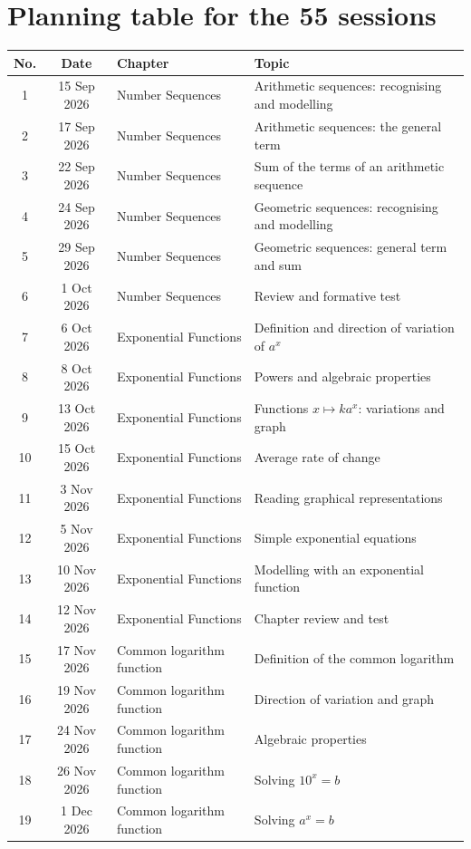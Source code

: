 \chapter{Planning table for the 55 sessions}
\small
\begin{longtable}{cclp{}}
\toprule
No. & Date & Chapter & Topic\\
\midrule\endhead
1 & 15 Sep 2026 & Number Sequences & Arithmetic sequences: recognising and modelling\\
2 & 17 Sep 2026 & Number Sequences & Arithmetic sequences: the general term\\
3 & 22 Sep 2026 & Number Sequences & Sum of the terms of an arithmetic sequence\\
4 & 24 Sep 2026 & Number Sequences & Geometric sequences: recognising and modelling\\
5 & 29 Sep 2026 & Number Sequences & Geometric sequences: general term and sum\\
6 & 1 Oct 2026 & Number Sequences & Review and formative test\\
7 & 6 Oct 2026 & Exponential Functions & Definition and direction of variation of $a^x$\\
8 & 8 Oct 2026 & Exponential Functions & Powers and algebraic properties\\
9 & 13 Oct 2026 & Exponential Functions & Functions $x\mapsto k a^x$: variations and graph\\
10 & 15 Oct 2026 & Exponential Functions & Average rate of change\\
11 & 3 Nov 2026 & Exponential Functions & Reading graphical representations\\
12 & 5 Nov 2026 & Exponential Functions & Simple exponential equations\\
13 & 10 Nov 2026 & Exponential Functions & Modelling with an exponential function\\
14 & 12 Nov 2026 & Exponential Functions & Chapter review and test\\
15 & 17 Nov 2026 & Common logarithm function & Definition of the common logarithm\\
16 & 19 Nov 2026 & Common logarithm function & Direction of variation and graph\\
17 & 24 Nov 2026 & Common logarithm function & Algebraic properties\\
18 & 26 Nov 2026 & Common logarithm function & Solving $10^x=b$\\
19 & 1 Dec 2026 & Common logarithm function & Solving $a^x=b$\\

\end{longtable}
